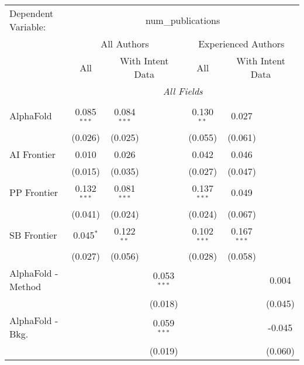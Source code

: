 \begingroup
\centering
\begin{tabular}{lcccccc}
   \tabularnewline \midrule \midrule
   Dependent Variable: & \multicolumn{6}{c}{num\_publications}\\
 & \multicolumn{3}{c}{All Authors} & \multicolumn{3}{c}{Experienced Authors} \\
\cmidrule(lr){2-4} \cmidrule(lr){5-7}
 & \multicolumn{1}{c}{All} & \multicolumn{2}{c}{With Intent Data} & \multicolumn{1}{c}{All} & \multicolumn{2}{c}{With Intent Data} \\
\cmidrule(lr){2-2} \cmidrule(lr){3-4} \cmidrule(lr){5-5} \cmidrule(lr){6-7}
 & \multicolumn{6}{c}{\textit{All Fields}} \\ \\
   AlphaFold                     & 0.085$^{***}$ & 0.084$^{***}$ &               & 0.130$^{**}$  & 0.027         &   \\   
                                 & (0.026)       & (0.025)       &               & (0.055)       & (0.061)       &   \\   
   AI Frontier                   & 0.010         & 0.026         &               & 0.042         & 0.046         &   \\   
                                 & (0.015)       & (0.035)       &               & (0.027)       & (0.047)       &   \\   
   PP Frontier                   & 0.132$^{***}$ & 0.081$^{***}$ &               & 0.137$^{***}$ & 0.049         &   \\   
                                 & (0.041)       & (0.024)       &               & (0.024)       & (0.067)       &   \\   
   SB Frontier                   & 0.045$^{*}$   & 0.122$^{**}$  &               & 0.102$^{***}$ & 0.167$^{***}$ &   \\   
                                 & (0.027)       & (0.056)       &               & (0.028)       & (0.058)       &   \\   
   AlphaFold - Method            &               &               & 0.053$^{***}$ &               &               & 0.004\\   
                                 &               &               & (0.018)       &               &               & (0.045)\\   
   AlphaFold - Bkg.              &               &               & 0.059$^{***}$ &               &               & -0.045\\   
                                 &               &               & (0.019)       &               &               & (0.060)\\   

\end{tabular}
